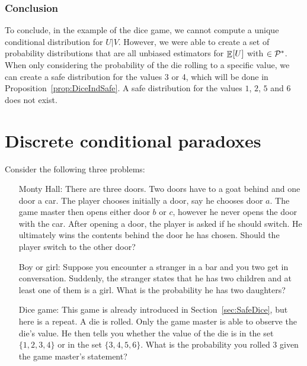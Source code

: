 \documentclass[a4paper]{report}
\theoremstyle{plain}
\theoremstyle{definition}
\theoremstyle{remark}
\numberwithin{equation}{chapter}
\let\P\relax
\DeclareMathOperator{\P}{\mathbb{P}}
\DeclareMathOperator{\E}{\mathbb{E}}
\DeclareMathOperator{\1}{\mathbbm{1}}
\newcommand{\Pmod}{\mathcal{P}^*}
\begin{document}
\subsection{Conclusion}
To conclude, in the example of the dice game, we cannot compute a unique conditional distribution for $U|V$. However, we were able to create a set of probability distributions that are all unbiased estimators for $\E_{\P}[U]$ with $\P\in\Pmod$. When only considering the probability of the die rolling to a specific value, we can create a safe distribution for the values 3 or 4, which will be done in Proposition~\ref{prop:DiceIndSafe}. A safe distribution for the values $1$, $2$, $5$ and $6$ does not exist.

\chapter{Discrete conditional paradoxes}\label{chap:DiscPara}
Consider the following three problems:
\begin{enumerate}
    \item[Monty Hall:] There are three doors. Two doors have to a goat behind and one door a car. The player chooses initially a door, say he chooses door $a$. The game master then opens either door $b$ or $c$, however he never opens the door with the car. After opening a door, the player is asked if he should switch. He ultimately wins the contents behind the door he has chosen. Should the player switch to the other door?
    \item[Boy or girl:] Suppose you encounter a stranger in a bar and you two get in conversation. Suddenly, the stranger states that he has two children and at least one of them is a girl. What is the probability he has two daughters?
    \item[Dice game:] This game is already introduced in Section~\ref{sec:SafeDice}, but here is a repeat. A die is rolled. Only the game master is able to observe the die's value. He then tells you whether the value of the die is in the set $\{1,2,3,4\}$ or in the set $\{3,4,5,6\}$. What is the probability you rolled $3$ given the game master's statement?
\end{enumerate}
\end{document}
